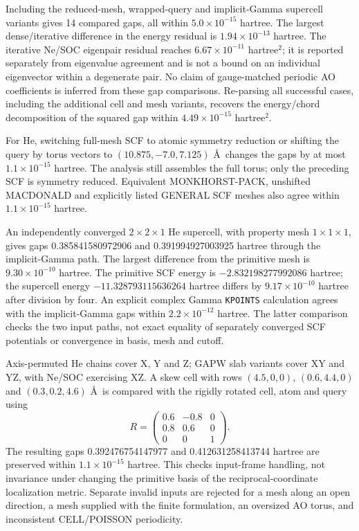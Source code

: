 \documentclass[11pt]{article}
\begin{document}
Including the reduced-mesh, wrapped-query and implicit-Gamma
supercell variants gives 14 compared gaps, all within
$5.0\times10^{-15}$ hartree. The largest dense/iterative difference
in the energy residual is $1.94\times10^{-13}$ hartree. The
iterative Ne/SOC eigenpair residual reaches
$6.67\times10^{-11}$ hartree$^2$; it is reported separately from
eigenvalue agreement and is not a bound on an individual
eigenvector within a degenerate pair. No claim of gauge-matched
periodic AO coefficients is inferred from these gap comparisons.
Re-parsing all successful cases, including the additional cell and
mesh variants, recovers the energy/chord decomposition of the
squared gap within $4.49\times10^{-15}$ hartree$^2$.

For He, switching full-mesh SCF to atomic symmetry reduction or
shifting the query by torus vectors to
$(10.875,-7.0,7.125)$ \AA\ changes the gaps by at most
$1.1\times10^{-15}$ hartree. The analysis still assembles the full
torus; only the preceding SCF is symmetry reduced. Equivalent
MONKHORST-PACK, unshifted MACDONALD and explicitly listed GENERAL
SCF meshes also agree within $1.1\times10^{-15}$ hartree.

An independently converged $2\times2\times1$ He supercell, with
property mesh $1\times1\times1$, gives gaps
0.385841580972906 and 0.391994927003925 hartree through the
implicit-Gamma path. The largest difference from the primitive
mesh is $9.30\times10^{-10}$ hartree. The primitive SCF energy is
$-2.832198277992086$ hartree; the supercell energy
$-11.328793115636264$ hartree differs by $9.17\times10^{-10}$
hartree after division by four. An explicit complex Gamma
\texttt{KPOINTS} calculation agrees with the implicit-Gamma gaps
within $2.2\times10^{-12}$ hartree. The latter comparison checks
the two input paths, not exact equality of separately converged
SCF potentials or convergence in basis, mesh and cutoff.

Axis-permuted He chains cover X, Y and Z; GAPW slab variants
cover XY and YZ, with Ne/SOC exercising XZ. A skew cell with rows
$(4.5,0,0)$, $(0.6,4.4,0)$ and $(0.3,0.2,4.6)$ \AA\ is
compared with the rigidly rotated cell, atom and query using
\[
 R=\begin{pmatrix}0.6&-0.8&0\\0.8&0.6&0\\0&0&1\end{pmatrix}.
\]
The resulting gaps 0.392476754147977 and 0.412631258413744 hartree
are preserved within $1.1\times10^{-15}$ hartree. This checks
input-frame handling, not invariance under changing the primitive
basis of the reciprocal-coordinate localization metric.
Separate invalid inputs are rejected for a mesh along an open
direction, a mesh supplied with the finite formulation, an
oversized AO torus, and inconsistent CELL/POISSON periodicity.
\end{document}
